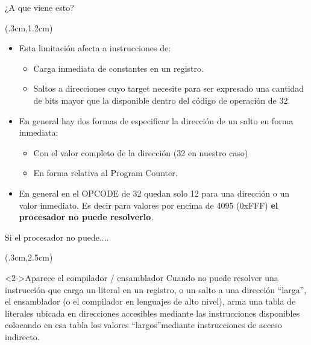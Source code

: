 \documentclass[usenames,table,dvipsnames,aspectratio=169]{beamer}
\begin{document}
\begin{frame}[fragile]{¿A que viene esto?}
 \begin{textblock*}{\textwidth}(.3cm,1.2cm)
  \begin{itemize}[<+(1)->] \justifying \parskip 0.2cm
   \item Esta limitación afecta a instrucciones de:
   \begin{itemize} \justifying \parskip 0.2cm
    \item Carga inmediata de constantes en un registro.
    \item Saltos a direcciones cuyo target necesite para ser expresado una cantidad de bits mayor que la disponible dentro del código de operación de \SI{32}{\bit}.
   \end{itemize}
   \item En general hay dos formas de especificar la dirección de un salto en forma inmediata: 
   \begin{itemize} \justifying  \parskip 0.2cm
    \item Con el valor completo de la dirección (\SI{32}{\bit} en nuestro caso) 
    \item En forma relativa al Program Counter.
   \end{itemize}
   \item En general en el OPCODE de \SI{32}{\bit} quedan solo 12 para una dirección o un valor inmediato. Es decir para valores por encima de 4095 (0xFFF) \textbf{el procesador no puede resolverlo}.
  \end{itemize}
 \end{textblock*}
\end{frame}

\begin{frame}[fragile]{Si el procesador no puede....}
 \begin{textblock*}{\textwidth}(.3cm,2.5cm)
  \begin{block}<2->{Aparece el compilador / ensamblador} \justifying
   Cuando no puede resolver una instrucción que carga un literal en un registro, o un salto a una dirección \textquotedblleft larga\textquotedblright, el ensamblador (o el compilador en lenguajes de alto nivel), arma una tabla de literales ubicada en direcciones accesibles mediante las instrucciones disponibles colocando en esa tabla los valores \textquotedblleft largos\textquotedblright mediante instrucciones de acceso indirecto.
  \end{block}
 \end{textblock*}
\end{frame}
\end{document}
